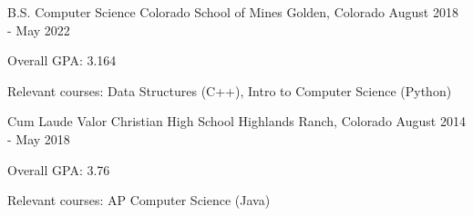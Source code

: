 

\begin{cventries}

  \cventry
    {B.S. Computer Science}
    {Colorado School of Mines} %
    {Golden, Colorado} %
    {August 2018 - May 2022} %
    {
      \begin{cvitems} %
        \item {Overall GPA: 3.164}
        \item {Relevant courses: Data Structures (C++), Intro to Computer Science
    (Python)}
      \end{cvitems}
    }
    
  \cventry
    {Cum Laude}
    {Valor Christian High School} %
    {Highlands Ranch, Colorado} %
    {August 2014 - May 2018} %
    {
      \begin{cvitems} %
        \item {Overall GPA: 3.76}
        \item {Relevant courses: AP Computer Science (Java) }
      \end{cvitems}
    }

\end{cventries}

